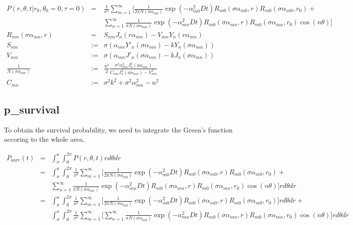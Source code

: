 \documentclass{article}
\begin{document}
\begin{eqnarray}
    P(r, \theta, t | r_0, \theta_0 = 0, \tau = 0) &=& \frac{1}{\sigma^2}
    \sum_{m=1}^{\infty}\Bigg[
        \frac{1}{2\pi N(\sigma\alpha_{m0})} \exp(-\alpha_{m0}^2Dt)
        R_{m0}(\sigma\alpha_{m0}, r) R_{m0}(\sigma\alpha_{m0}, r_0) +
        \nonumber\\
        & &\sum_{n=1}^{\infty} \frac{1}{\pi N(\sigma\alpha_{mn})}
        \exp(-\alpha_{mn}^2Dt)
        R_{m0}(\sigma\alpha_{mn}, r) R_{m0}(\sigma\alpha_{mn}, r_0)\cos(n\theta) \Bigg] \\
    R_{mn}(\sigma\alpha_{mn}, r) &=&
        S_{mn}J_n(r\alpha_{mn}) -
        V_{mn}Y_n(r\alpha_{mn}) \\
    S_{mn} &:=& \sigma(\alpha_{mn}Y'_n(\sigma\alpha_{mn}) - kY_n(\sigma\alpha_{mn})) \\
    V_{mn} &:=& \sigma(\alpha_{mn}J'_n(\sigma\alpha_{mn}) - kJ_n(\sigma\alpha_{mn})) \\
    \frac{1}{N(\sigma\alpha_{mn})} &:=& \frac{\pi^2}{2}
        \frac{\sigma^2\alpha_{mn}^2 J^2_n(a\alpha_{mn})}
             {C_{mn} J_n^2(a\alpha_{mn}) - V_{mn}^2} \\
    C_{mn} &:=& \sigma^2k^2 + \sigma^2\alpha_{mn}^2 - n^2
\end{eqnarray}


\subsection{p\_survival}

To obtain the survival probability, we need to integrate the Green's function
accoring to the whole area.

\begin{eqnarray}
    P_{\mathrm{surv}}(t) &=& \int_\sigma^a \int_0^{2\pi} P(r, \theta, t) rd\theta dr\\
        &=& \int_\sigma^a \int_0^{2\pi}  \frac{1}{\sigma^2}
            \sum_{m=1}^{\infty}\Bigg[
                \frac{1}{2\pi N(\sigma\alpha_{m0})} \exp(-\alpha_{m0}^2Dt)
                R_{m0}(\sigma\alpha_{m0}, r) R_{m0}(\sigma\alpha_{m0}, r_0) +
                \nonumber\\
                & &\sum_{n=1}^{\infty} \frac{1}{\pi N(\sigma\alpha_{mn})}
                \exp(-\alpha_{mn}^2Dt)
                R_{m0}(\sigma\alpha_{mn}, r) R_{m0}(\sigma\alpha_{mn}, r_0)\cos(n\theta)
            \Bigg] r d\theta dr\\
        &=& \int_\sigma^a \int_0^{2\pi} \frac{1}{\sigma^2} \sum_{m=1}^{\infty} \Bigg[
                \frac{1}{2\pi N(\sigma\alpha_{m0})} \exp(-\alpha_{m0}^2Dt)
                R_{m0}(\sigma\alpha_{m0}, r) R_{m0}(\sigma\alpha_{m0}, r_0)\Bigg] r d\theta dr +
                \nonumber\\
        & &\int_\sigma^a \int_0^{2\pi} \frac{1}{\sigma^2} \sum_{m=1}^{\infty} \Bigg[
            \sum_{n=1}^{\infty} \frac{1}{\pi N(\sigma\alpha_{mn})}
                \exp(-\alpha_{mn}^2Dt)
                R_{m0}(\sigma\alpha_{mn}, r) R_{m0}(\sigma\alpha_{mn}, r_0)\cos(n\theta)
            \Bigg] r d\theta dr\\
\end{eqnarray}
\end{document}
